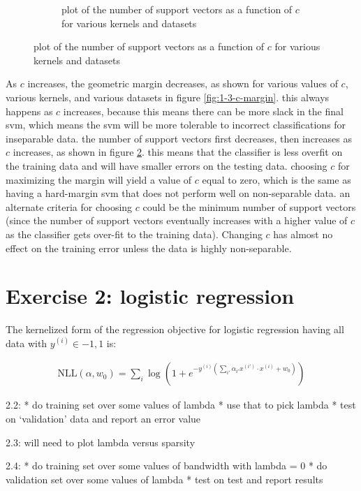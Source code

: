 \documentclass[10pt]{article}
\begin{document}
\begin{figure}[!ht]
\begin{subfigure}[b]{0.46\textwidth}
	\caption{plot of the number of support vectors as a function of $c$ for various kernels and datasets}
	\label{fig:1-3-support-vectors}
\end{subfigure}
\end{figure}

As $c$ increases, the geometric margin decreases, as shown for various values of $c$, various kernels, and various datasets in figure \ref{fig:1-3-c-margin}. this always happens as $c$ increases, because this means there can be more slack in the final svm, which means the svm will be more tolerable to incorrect classifications for inseparable data. the number of support vectors first decreases, then increases as $c$ increases, as shown in figure \ref{fig:1-3-support-vectors}. this means that the classifier is less overfit on the training data and will have smaller errors on the testing data. choosing $c$ for maximizing the margin will yield a value of $c$ equal to zero, which is the same as having a hard-margin svm that does not perform well on non-separable data. an alternate criteria for choosing $c$ could be the minimum number of support vectors (since the number of support vectors eventually increases with a higher value of $c$ as the classifier gets over-fit to the training data). Changing $c$ has almost no effect on the training error unless the data is highly non-separable.

\section{Exercise 2: logistic regression}

The kernelized form of the regression objective for logistic regression having all data with $y^{(i)} \in {-1, 1}$ is:

\begin{subequations}
	\begin{align}
		\text{NLL}(\alpha, w_0) = \sum_i \log \left(1 + e^{-y^{(i)}\left(\displaystyle\sum_{i'} \alpha_{i'} x^{(i')} \cdot x^{(i)} + w_0\right)}\right)
	\end{align}
\end{subequations}

2.2: 
* do training set over some values of lambda
* use that to pick lambda
* test on `validation' data and report an error value

2.3:
will need to plot lambda versus sparsity

2.4:
* do training set over some values of bandwidth with lambda = 0
* do validation set over some values of lambda
* test on test and report results
\end{document}
